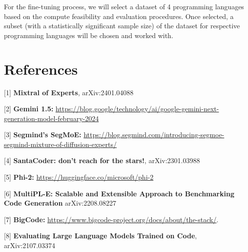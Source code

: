 \documentclass{article}
\begin{document}
	\vspace{-1em}

	For the fine-tuning process, we will select a dataset of 4 programming
	languages based on the compute feasibility and evaluation procedures. Once selected,
	a subset (with a statistically significant sample size) of the dataset for
	respective programming languages will be chosen and worked with.

	\vspace{-1em}
	
  \section*{References}

	\small [1] {\textbf{Mixtral of Experts}}, arXiv:2401.04088

	[2] {\textbf{Gemini 1.5: }}\url{https://blog.google/technology/ai/google-gemini-next-generation-model-february-2024}

	[3] \textbf{Segmind's SegMoE: }\url{https://blog.segmind.com/introducing-segmoe-segmind-mixture-of-diffusion-experts/}

	[4] \textbf{SantaCoder: don't reach for the stars!}, arXiv:2301.03988

	[5] \textbf{Phi-2: }\url{https://huggingface.co/microsoft/phi-2}

	[6] \textbf{MultiPL-E: Scalable and Extensible Approach to Benchmarking Code Generation}
	arXiv:2208.08227

	[7] \textbf{BigCode: }\url{https://www.bigcode-project.org/docs/about/the-stack/}.

	[8] {\textbf{Evaluating Large Language Models Trained on Code}}, arXiv:2107.03374
\end{document}
